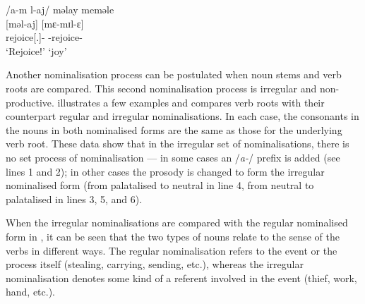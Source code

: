 \ea \label{ex:4:19}
\textup{/a-m l-aj/ \hspace{10pt}   məlay  \hspace{70pt}    meməle}\\
\hspace{55pt}   [məl-aj]  \hspace{60pt}    [mɛ-mɪl-ɛ]\\
\hspace{55pt}      rejoice[{\twoS}.{\IMP}]-{\CL} \hspace{20pt} {\NOM}{}-rejoice-{\CL}\\
\glt \hspace{55pt} ‘Rejoice!’ \hspace{55pt}   ‘joy’
\z

Another nominalisation process can be postulated when noun stems and verb roots are compared. This second nominalisation process is irregular and non-productive.  illustrates a few examples and compares verb roots with their counterpart regular and irregular nominalisations. In each case, the consonants in the nouns in both nominalised forms are the same as those for the underlying verb root. These data show that in the irregular set of nominalisations, there is no set process of nominalisation --- in some cases an /\textit{a-}/ prefix is added (see lines 1 and 2); in other cases the prosody is changed to form the irregular nominalised form (from palatalised to neutral in line 4, from neutral to palatalised in lines 3, 5, and 6). 

When the irregular nominalisations are compared with the regular nominalised form in , it can be seen that the two types of nouns relate to the sense of the verbs in different ways. The regular nominalisation refers to the event or the process itself (stealing, carrying, sending, etc.), whereas the irregular nominalisation denotes some kind of a referent involved in the event (thief, work, hand, etc.). 

